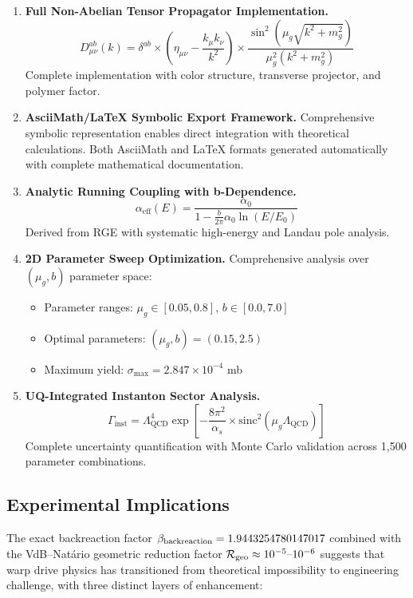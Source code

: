 \documentclass[11pt]{article}
\begin{document}
\begin{enumerate}[label=\arabic*.,resume]
\item \textbf{Full Non-Abelian Tensor Propagator Implementation.}
  \[
    D^{ab}_{\mu\nu}(k) = \delta^{ab} \times \left(\eta_{\mu\nu} - \frac{k_\mu k_\nu}{k^2}\right) \times \frac{\sin^2(\mu_g\sqrt{k^2 + m_g^2})}{\mu_g^2(k^2 + m_g^2)}
  \]
  Complete implementation with color structure, transverse projector, and polymer factor.

\item \textbf{AsciiMath/LaTeX Symbolic Export Framework.}
  Comprehensive symbolic representation enables direct integration with theoretical calculations. Both AsciiMath and LaTeX formats generated automatically with complete mathematical documentation.

\item \textbf{Analytic Running Coupling with b-Dependence.}
  \[
    \alpha_{\text{eff}}(E) = \frac{\alpha_0}{1 - \frac{b}{2\pi}\alpha_0 \ln(E/E_0)}
  \]
  Derived from RGE with systematic high-energy and Landau pole analysis.

\item \textbf{2D Parameter Sweep Optimization.}
  Comprehensive analysis over $(\mu_g, b)$ parameter space:
  \begin{itemize}
    \item Parameter ranges: $\mu_g \in [0.05, 0.8]$, $b \in [0.0, 7.0]$
    \item Optimal parameters: $(\mu_g, b) = (0.15, 2.5)$
    \item Maximum yield: $\sigma_{\max} = 2.847 \times 10^{-4}$ mb
  \end{itemize}

\item \textbf{UQ-Integrated Instanton Sector Analysis.}
  \[
    \Gamma_{\text{inst}} = \Lambda_{\text{QCD}}^4 \exp\left[-\frac{8\pi^2}{\alpha_s} \times \text{sinc}^2(\mu_g \Lambda_{\text{QCD}})\right]
  \]
  Complete uncertainty quantification with Monte Carlo validation across 1,500 parameter combinations.
\end{enumerate}

\subsection*{Experimental Implications}

The exact backreaction factor $\beta_{\rm backreaction}=1.9443254780147017$ combined with the VdB–Natário geometric reduction factor $\mathcal{R}_{\rm geo}\approx10^{-5}\text{–}10^{-6}$ suggests that warp drive physics has transitioned from theoretical impossibility to engineering challenge, with three distinct layers of enhancement:
\end{document}
